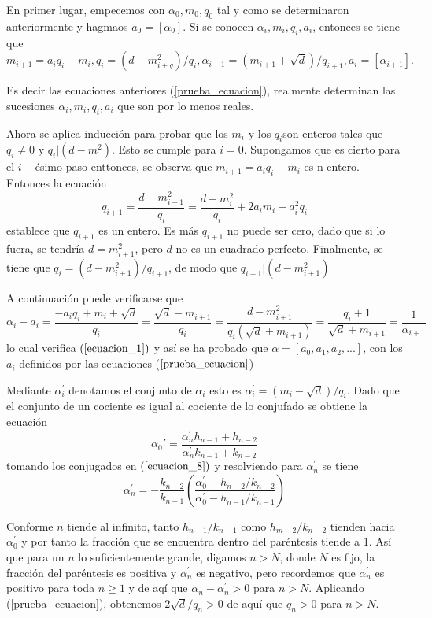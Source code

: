 \documentclass[11pt, article]{article}
\begin{document}
    En primer lugar, empecemos con $\alpha_0,m_0,q_0$ tal y como se determinaron anteriormente  y hagmaos $a_0=[\alpha_0]$. Si se conocen $\alpha_i,m_i,q_i,a_i$, entonces se tiene que 
        \[
         m_{i+1}=a_iq_i - m_i, q_i=(d-m_{i+q}^2)/q_i, \alpha_{i+1}=(m_{i+1} + \sqrt{d})/q_{i+1}, a_i=[\alpha_{i+1}].
         \]
    
    Es decir las ecuaciones anteriores (\ref{prueba_ecuacion}), realmente determinan las sucesiones $\alpha_i,m_i,q_i,a_i$ que son por lo menos reales.
    
    Ahora se aplica inducción para probar que los $m_i$ y los $q_i$son enteros tales que $q_i\not=0$ y $q_i|(d-m^2)$. Esto se cumple para $i=0$. Supongamos que es cierto para el $i-$ésimo paso enttonces, se observa que $m_{i+1}=a_iq_i-m_i$ es n entero. Entonces la ecuación 
         \[
        q_{i+1}=\dfrac{d-m_{i+1}^2}{q_i}=\dfrac{d-m_i^2}{q_i} + 2a_im_i-a_i^2q_i
        \]
    establece que $q_{i+1}$ es un entero. Es más $q_{i+1}$ no puede ser cero, dado que si lo fuera, se tendría $d=m^2_{i+1}$, pero $d$ no es un cuadrado perfecto. Finalmente, se tiene que $q_i=(d-m_{i+1}^2)/q_{i+1}$, de modo que $q_{i+1}|(d-m_{i+1}^2)$
    
    A continuación puede verificarse que 
        \[
        \alpha_i-a_i=\dfrac{-a_iq_i+m_i+\sqrt{d}}{q_i}=\dfrac{\sqrt{d}-m_{i+1}}{q_i}=\dfrac{d-m_{i+1}^2}{q_i(\sqrt{d}+m_{i+1})}=\dfrac{q_i+1}{\sqrt{d}+m_{i+1}}=\dfrac{1}{\alpha_{i+1}}
        \]
    lo cual verifica $(\ref{ecuacion_1})$ y así se ha probado que $\alpha=[a_0,a_1,a_2,...]$, con los $a_i$ definidos por las ecuaciones ($\ref{prueba_ecuacion}$)
    
    Mediante $\alpha^{'}_{i}$ denotamos el conjunto de $\alpha_i$ esto es $\alpha^{'}_{i}=(m_i-\sqrt{d})/q_i$. Dado que el conjunto de un cociente es igual al cociente de lo conjufado se obtiene la ecuación
        \[
        \alpha_0{'}=\dfrac{\alpha_n^{'}h_{n-1}+h_{n-2}}{\alpha_n^{'}k_{n-1}+k_{n-2}}
        \]
    tomando los conjugados en $(\ref{ecuacion_8})$ y resolviendo para $\alpha_n^{'}$ se tiene
        \[
        \alpha_n^{'}=-\dfrac{k_{n-2}}{k_{n-1}}\left(\dfrac{\alpha_0^{'}-h_{n-2}/k_{n-2}}{\alpha_0^{'}-h_{n-1}/k_{n-1}}\right)
        \]
        
    Conforme $n$ tiende al infinito, tanto $h_{n-1}/k_{n-1}$ como $h_{m-2}/k_{n-2}$ tienden hacia $\alpha_0^{'}$ y por tanto la fracción que se encuentra dentro del paréntesis tiende a 1. Así que para un $n$ lo suficientemente grande, digamos $n>N$, 
    donde $N$ es fijo, la fracción del paréntesis es positiva y $\alpha_n^{'}$ es negativo, pero recordemos que $\alpha_n^{'}$ es positivo para toda
    $n\geq 1$ y de aqí que $\alpha_n - \alpha_n^{'}>0$ para $n>N$. Aplicando (\ref{prueba_ecuacion}), obtenemos $2 \sqrt{d}/q_{n} >0$
    de aquí que $q_n>0$ para $n>N$.
    
\end{document}

